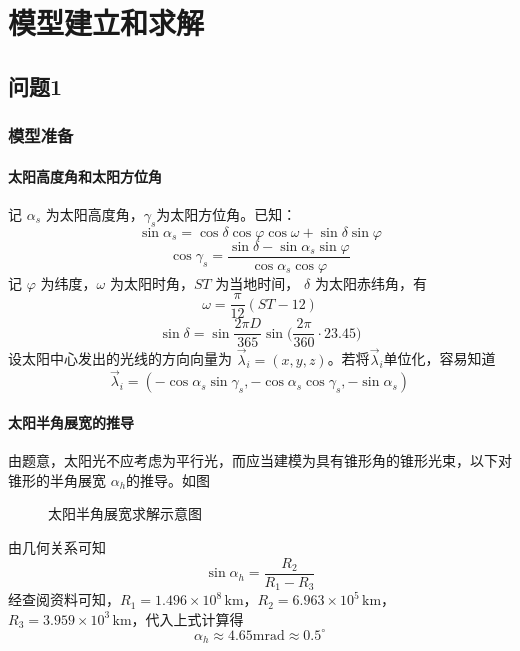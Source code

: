 \documentclass[../main.tex]{subfiles}
\begin{document}
\section{模型建立和求解}
\subsection{问题1}
\subsubsection{模型准备}
\paragraph{太阳高度角和太阳方位角}
记 \(\alpha _{s}\) 为太阳高度角，\(\gamma _{s}\)为太阳方位角。已知：
\begin{equation}
\sin \alpha _{s} = \cos \delta \cos \varphi \cos \omega + \sin \delta \sin \varphi\label{equ:alpha}
\end{equation}
\begin{equation}
\cos \gamma _{s} = \frac{\sin \delta -\sin \alpha_{s} \sin \varphi}{\cos \alpha _{s} \cos \varphi}\label{equ:gamma}
\end{equation}
记 \( \varphi\) 为纬度，\(\omega\) 为太阳时角，\(ST\) 为当地时间， \(\delta\) 为太阳赤纬角，有
\begin{equation}
\omega = \frac{\pi}{12} ( ST - 12)
\end{equation}
\begin{equation}
\sin \delta = \sin \frac{2 \pi D}{365} \sin \big(\frac{2\pi}{360} \cdot 23.45\big)
\end{equation}
设太阳中心发出的光线的方向向量为 \(\vec\lambda _{i} = (x,  y , z)\)。若将\(\vec \lambda_{i}\)单位化，容易知道
\begin{equation}
\vec \lambda _{i} = ({-} \cos \alpha _{s} \sin \gamma_{s} ,{-} \cos \alpha_{s} \cos \gamma_{s}, {-} \sin \alpha_{s})
\end{equation}
\paragraph{太阳半角展宽的推导}
由题意，太阳光不应考虑为平行光，而应当建模为具有锥形角的锥形光束，以下对锥形的半角展宽 \( \alpha_{h}\)的推导。如图
%
\begin{figure}[H]
\centering

\caption{\kaishu 太阳半角展宽求解示意图}
\end{figure}
%
由几何关系可知
\begin{equation}
\sin \alpha_{h} = \frac{R_{2}}{R_1 - R_3}
\end{equation}
经查阅资料可知，\(R_1 = 1.496\times 10 ^{8} \, \mathrm{km}\)，\(R_2 = 6.963\times 10 ^{5}\,\mathrm{km}\)，\(R_3 = 3.959\times 10^{3}\, \mathrm{km}\)，代入上式计算得
\begin{equation}
\alpha_{h} \approx 4.65 \mathrm{mrad} \approx 0.5 ^{\circ}
\end{equation}
\end{document}
